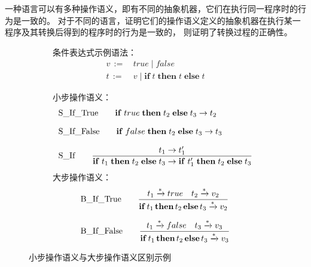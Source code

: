 一种语言可以有多种操作语义，即有不同的抽象机器，它们在执行同一程序时的行为是一致的。
对于不同的语言，证明它们的操作语义定义的抽象机器在执行某一程序及其转换后得到的程序时的行为是一致的，
则证明了转换过程的正确性。

\begin{figure}[htbp]
    \vspace{13pt}
    \centering
    \begin{subfigure}[b]{0.8\textwidth}
        条件表达式示例语法：
        \begin{align*}
        v\, := &\,  true\; |\; false \\
        t\, := & \, v\; |\; \mathbf{if}\; t\; \mathbf{then}\; t\; \mathbf{else}\; t
        \end{align*}
    \end{subfigure}
    \vfill
    \begin{subfigure}[b]{0.8\textwidth}
        小步操作语义：
    \begin{equation}
        \setlength{\jot}{10pt}
        \nonumber
            \begin{aligned}
            & \text{S\_If\_True} \qquad \mathbf{if}\; true\; \mathbf{then}\; t_2\; \mathbf{else}\; t_3\rightarrow t_2 \\
            &  \text{S\_If\_False} \qquad \mathbf{if}\; false\; \mathbf{then}\; t_2\; \mathbf{else}\; t_3\rightarrow t_3 \\
            & \text{S\_If} \qquad \displaystyle{\frac{t_1\rightarrow t'_1}{\mathbf{if}\; t_1\; \mathbf{then}\; t_2\; \mathbf{else}\; t_3\rightarrow \mathbf{if}\; t'_1\; \mathbf{then}\; t_2\; \mathbf{else}\; t_3 }}
        \end{aligned}
    \end{equation}
      大步操作语义：
        \begin{equation}
            \setlength{\jot}{10pt}
            \nonumber
            \begin{aligned}
                & \text{B\_If\_True} \qquad \displaystyle{\frac{t_1\xrightarrow{*} true\quad t_2\xrightarrow{*} v_2}{\mathbf{if}\, t_1\, \mathbf{then}\, t_2\, \mathbf{else}\, t_3\xrightarrow{*} v_2 }} \\       
                & \text{B\_If\_False} \qquad \displaystyle{\frac{t_1\xrightarrow{*} false\quad t_3\xrightarrow{*} v_3}{\mathbf{if}\, t_1\, \mathbf{then}\, t_2\, \mathbf{else}\, t_3\xrightarrow{*} v_3 }}
            \end{aligned}
        \end{equation}
    \end{subfigure}
    \vspace{5pt}
    \caption{小步操作语义与大步操作语义区别示例}\label{fig:bigsmall}
\end{figure}


